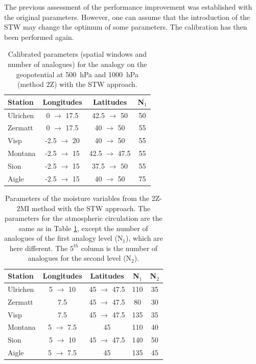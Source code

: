 \documentclass[hess]{copernicus}
\begin{document}
The previous assessment of the performance improvement was established with the original parameters. However, one can assume that the introduction of the STW may change the optimum of some parameters. The calibration has then been performed again.

\begin{table}[htb]
	\caption{Calibrated parameters (spatial windows and number of analogues) for the analogy on the geopotential at 500~hPa and 1000~hPa (method 2Z) with the STW approach.}
	\begin{center}
		\begin{tabular}{l c c c }
			\hline
			Station & Longitudes & Latitudes & N$_{1}$ \\
			\hline
			Ulrichen & 0 $\rightarrow$ 17.5 & 42.5 $\rightarrow$ 50 & 50 \\
			Zermatt & 0 $\rightarrow$ 17.5 & 40 $\rightarrow$ 50 & 55 \\
			Visp & -2.5 $\rightarrow$ 20 & 40 $\rightarrow$ 50 & 55 \\
			Montana & -2.5 $\rightarrow$ 15 & 42.5 $\rightarrow$ 47.5 & 55 \\
			Sion & -2.5 $\rightarrow$ 15 & 37.5 $\rightarrow$ 50 & 55 \\
			Aigle & -2.5 $\rightarrow$ 15 & 40 $\rightarrow$ 50 & 75 \\
			\hline
		\end{tabular}
	\end{center}
	\label{table:params_2Z_new}
\end{table}

\begin{table}[htb]
	\caption{Parameters of the moisture variables from the 2Z-2MI method with the STW approach. The parameters for the atmospheric circulation are the same as in Table \ref{table:params_2Z_new}, except the number of analogues of the first analogy level (N$_{1}$), which are here different. The $5^{th}$ column is the number of analogues for the second level (N$_{2}$).}
	\begin{center}
		\begin{tabular}{l c c c c }
			\hline
			Station & Longitudes & Latitudes & N$_{1}$ & N$_{2}$ \\
			\hline
			Ulrichen & 5 $\rightarrow$ 10 & 45 $\rightarrow$ 47.5 & 110 & 35 \\
			Zermatt & 7.5 & 45 $\rightarrow$ 47.5 & 80 & 30 \\
			Visp & 7.5 & 45 $\rightarrow$ 47.5 & 135 & 35 \\
			Montana & 5 $\rightarrow$ 7.5 & 45 & 110 & 40 \\
			Sion & 5 $\rightarrow$ 10 & 45 $\rightarrow$ 47.5 & 140 & 50 \\
			Aigle & 5 $\rightarrow$ 7.5 & 45 & 135 & 45 \\ 
			\hline
		\end{tabular}
	\end{center}
	\label{table:params_2Z-2MI_new}
\end{table}
\end{document}
